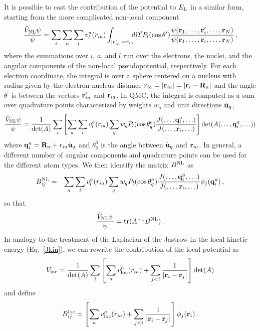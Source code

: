 \documentclass[aip,jcp,reprint,floatfix,onecolumn]{revtex4-1}
\def\det{\text{det}}
\def\tr{\text{tr}}
\begin{document}
It is possible to cast the contribution of the potential to $E_{\rm L}$
in a similar form, starting from the more complicated non-local component
\begin{eqnarray}
\frac{\hat{V}_{\rm NL} \psi}{\psi}=\sum_i\sum_a\sum_l v_l^a(r_{ia})
\int_{|r^\prime_{ia}|=r_{ia}} \hspace*{-0.5em}d\Omega^\prime P_l(\cos\theta^\prime)\frac{\psi({\bf r}_1,\ldots,{\bf r}_i^\prime,\ldots,{\bf r}_N)}{\psi({\bf r}_1,\ldots,{\bf r}_i,\ldots,{\bf r}_N)}\,,
\end{eqnarray}
where the summations over $i$, $a$, and $l$ run over the electrons, the nuclei, and the angular components of the non-local pseudopotential, respectively.
For each electron coordinate, the integral is over a sphere centered on a nucleus with radius given by the electron-nucleus distance
$r_{ia}=|{\bf r}_{ia}|=|{\bf r}_i-{\bf R}_a|$ and the angle $\theta^\prime$ is between the vectors ${\bf r}^\prime_{ia}$  and ${\bf r}_{ia}$.
In QMC, the integral is computed as a sum over quadrature points characterized by weights $w_q$ and
unit directions $\hat{\bf u}_q$,
\begin{eqnarray}
\frac{{\hat{V}}_{\rm NL} \psi}{\psi}=\frac{1}{\det(A)}\sum_i\left[\sum_a\sum_l v_l^a(r_{ia})
\sum_{q} w_{q}P_l(\cos\theta^a_{q})\frac{J(\ldots,{\bf q}^a_i,\ldots)}{J(\ldots,{\bf r}_i,\ldots)}\right]\det(A(\ldots,{\bf q}^a_i,\ldots))
\label{vNL}
\end{eqnarray}
where ${\bf q}^a_i={\bf R}_a+r_{ia} \hat{\bf u}_q$ and $\theta^a_{q}$ is the angle between $\hat{\bf u}_q$ and ${\bf r}_{ia}$.
In general, a different number of angular components and quadrature points can be used for the different atom types.
We then identify the matrix $B^{\rm NL}$ as
\begin{eqnarray}
B^{\rm NL}_{ij}&=&\sum_a \sum_l v_l^a(r_{ia})
\sum_{q} w_{q}P_l(\cos\theta^a_{q})\frac{J(\ldots,{\bf q}^a_i,\ldots)}{J(\ldots,{\bf r}_i,\ldots)}\phi_j({\bf q}^a_i)\,,
\label{BNL}
\end{eqnarray}
so that
\begin{eqnarray}
\frac{{\hat{V}}_{\rm NL} \psi}{\psi}=\tr(A^{-1}B^{\rm NL})\,.
\end{eqnarray}
In analogy to the treatment of the Laplacian of the Jastrow in the local kinetic energy (Eq.~\ref{Jkin}), we can rewrite the contribution of the local potential as
\begin{eqnarray}
{V}_{\rm loc} = \frac{1}{\det(A)} \sum_i\left[\sum_a v_{\rm loc}^a(r_{ia})+\sum_{j<i}\frac{1}{|{\bf r}_i-{\bf r}_j|}\right]\det(A)
\label{vL}
\end{eqnarray}
and define
\begin{eqnarray}
B_{ij}^{\rm loc}=\left[ \sum_a v_{\rm loc}^a(r_{ia})+\sum_{j<i}\frac{1}{|{\bf r}_i-{\bf r}_j|} \right]\phi_{j}({\bf r}_i)\,.
\label{Bloc}
\end{eqnarray}
\end{document}
